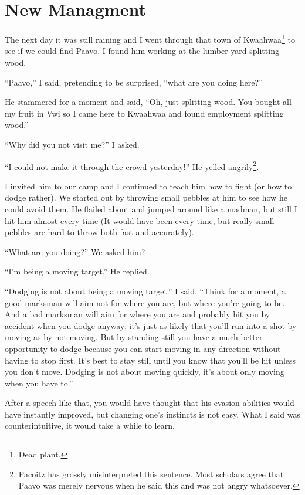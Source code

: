 \chapter{New Managment}

The next day it was still raining and I went through that town of Kwaa\-hwaa\footnote{Dead plant.} to see if we could find Paavo. I found him working at the lumber yard splitting wood.

``Paavo,'' I said, pretending to be surprised, ``what are you doing here?''

He stammered for a moment and said, ``Oh, just splitting wood. You bought all my fruit in Vwi so I came here to Kwaa\-hwaa and found employment splitting wood.''

``Why did you not visit me?'' I asked.

``I could not make it through the crowd yesterday!'' He yelled angrily\footnote{Pacoitz has grossly misinterpreted this sentence. Most scholars agree that Paavo was merely nervous when he said this and was not angry whatsoever.}.

I invited him to our camp and I continued to teach him how to fight (or how to dodge rather).
We started out by throwing small pebbles at him to see how he could avoid them. He flailed about and jumped around like a madman, but still I hit him almost every time (It would have been every time, but really small pebbles are hard to throw both fast and accurately).

``What are you doing?'' We asked him?

``I'm being a moving target.'' He replied.

``Dodging is not about being a moving target.'' I said, ``Think for a moment, a good marksman will aim not for where you are, but where you're going to be. And a bad marksman will aim for where you are and probably hit you by accident when you dodge anyway; it's just as likely that you'll run into a shot by moving as by not moving. But by standing still you have a much better opportunity to dodge because you can start moving in any direction without having to stop first. It's best to stay still until you know that you'll be hit unless you don't move.
Dodging is not about moving quickly, it's about only moving when you have to.''

After a speech like that, you would have thought that his evasion abilities would have instantly improved, but changing one's instincts is not easy. What I said was counterintuitive, it would take a while to learn.

